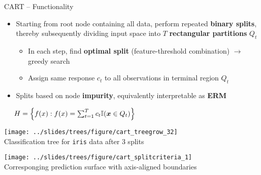 \begin{frame}{CART -- Functionality}

\footnotesize

 
  

\medskip

\begin{itemize}
  \item Starting from root node containing all data, perform repeated 
  \textbf{binary splits}, thereby subsequently dividing input space into $T$ 
  \textbf{rectangular partitions} $Q_t$
  \begin{itemize}
    \item In each step, find \textbf{optimal split} (feature-threshold 
    combination) $\rightarrow$ greedy search
    \item Assign same response $c_t$ to all observations in terminal region 
    $Q_t$
  \end{itemize}
  \item Splits based on node \textbf{impurity}, equivalently interpretable as 
  \textbf{ERM}
\end{itemize}

\medskip
 
 ~~
$H = \left\{ f(x): f(x) = \sum_{t = 1}^T c_t \mathbb{I}(\bm{x} \in Q_t) 
\right\}$

\medskip

\begin{minipage}[b]{0.5\textwidth}
  \texttt{[image: ../slides/trees/figure/cart\_treegrow\_32]} \\
  \tiny{Classification tree for \texttt{iris} data after 3 splits}
\end{minipage}
\begin{minipage}[b]{0.49\textwidth}
  \texttt{[image: 
  ../slides/trees/figure/cart\_splitcriteria\_1]} \\
  \tiny{Corresponging prediction surface with axis-aligned boundaries}
\end{minipage}%

\end{frame}



